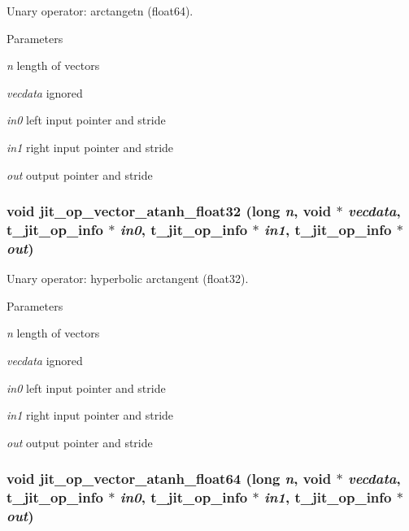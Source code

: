 Unary operator: arctangetn (float64). 
\begin{DoxyParams}{Parameters}
\item[{\em n}]length of vectors \item[{\em vecdata}]ignored \item[{\em in0}]left input pointer and stride \item[{\em in1}]right input pointer and stride \item[{\em out}]output pointer and stride \end{DoxyParams}
\hypertarget{group__opvecmod_gab141096b192c0b8e4cd6a22d7137ff5b}{
\subsubsection[{jit\_\-op\_\-vector\_\-atanh\_\-float32}]{\setlength{\rightskip}{0pt plus 5cm}void jit\_\-op\_\-vector\_\-atanh\_\-float32 (long {\em n}, \/  void $\ast$ {\em vecdata}, \/  {\bf t\_\-jit\_\-op\_\-info} $\ast$ {\em in0}, \/  {\bf t\_\-jit\_\-op\_\-info} $\ast$ {\em in1}, \/  {\bf t\_\-jit\_\-op\_\-info} $\ast$ {\em out})}}
\label{group__opvecmod_gab141096b192c0b8e4cd6a22d7137ff5b}


Unary operator: hyperbolic arctangent (float32). 
\begin{DoxyParams}{Parameters}
\item[{\em n}]length of vectors \item[{\em vecdata}]ignored \item[{\em in0}]left input pointer and stride \item[{\em in1}]right input pointer and stride \item[{\em out}]output pointer and stride \end{DoxyParams}
\hypertarget{group__opvecmod_ga5a6cef334e4a169eb9dc02191406230c}{
\subsubsection[{jit\_\-op\_\-vector\_\-atanh\_\-float64}]{\setlength{\rightskip}{0pt plus 5cm}void jit\_\-op\_\-vector\_\-atanh\_\-float64 (long {\em n}, \/  void $\ast$ {\em vecdata}, \/  {\bf t\_\-jit\_\-op\_\-info} $\ast$ {\em in0}, \/  {\bf t\_\-jit\_\-op\_\-info} $\ast$ {\em in1}, \/  {\bf t\_\-jit\_\-op\_\-info} $\ast$ {\em out})}}
\label{group__opvecmod_ga5a6cef334e4a169eb9dc02191406230c}


